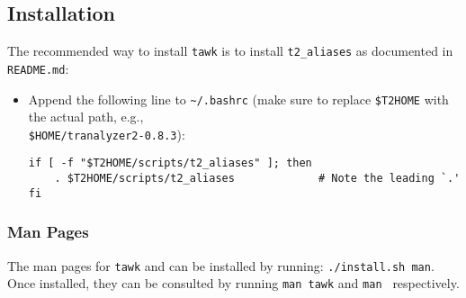 \documentclass[documentation]{subfiles}
\begin{document}
\subsection{Installation}
The recommended way to install {\tt tawk} is to install {\tt t2\_aliases} as documented in {\tt README.md}:
\begin{itemize}
    \item Append the following line to {\tt\textasciitilde{}/.bashrc} (make sure to replace {\tt\$T2HOME}
          with the actual path, e.g.,\\{\tt\$HOME/tranalyzer2-0.8.3}):
\begin{lstlisting}
if [ -f "$T2HOME/scripts/t2_aliases" ]; then
    . $T2HOME/scripts/t2_aliases             # Note the leading `.'
fi
\end{lstlisting}
\end{itemize}

\subsubsection{Man Pages}
The man pages for {\tt tawk} and {\tt{}} can be installed by running: {\tt ./install.sh man}.
Once installed, they can be consulted by running {\tt man tawk} and {\tt man } respectively.
\end{document}
